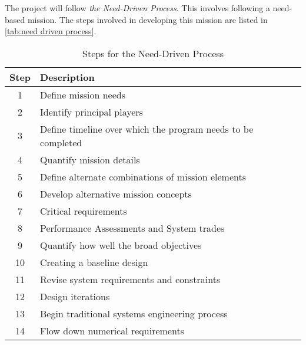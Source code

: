 \documentclass[conference]{IEEEtran} %
\begin{document}
The project will follow \textit{the Need-Driven Process}. This involves following a need-based mission. The steps involved in developing this mission are listed in \autoref{tab:need driven process}.

\begin{table}[h!]
    \caption{Steps for the Need-Driven Process}
    \centering
    \begin{tabular}{@{}cl@{}}
    \toprule
    Step & Description \\
    \midrule
    1 & Define mission needs \\
    2 & Identify principal players \\
    3 & Define timeline over which the program needs to be completed \\
    4 & Quantify mission details \\
    5 & Define alternate combinations of mission elements \\
    6 & Develop alternative mission concepts \\
    7 & Critical requirements \\
    8 & Performance Assessments and System trades \\
    9 & Quantify how well the broad objectives \\
    10 & Creating a baseline design \\
    11 & Revise system requirements and constraints \\
    12 & Design iterations \\
    13 & Begin traditional systems engineering process \\
    14 & Flow down numerical requirements \\
    \bottomrule
    \end{tabular}
\label{tab:need driven process}
\end{table}
\end{document}
